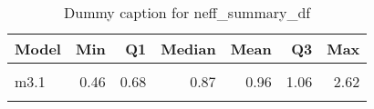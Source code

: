 \begin{table}
\centering
\caption{Dummy caption for neff_summary_df}
\centering
\fontsize{10}{12}\selectfont
\begin{tabular}[t]{lrrrrrr}
\toprule
Model & Min & Q1 & Median & Mean & Q3 & Max\\
\midrule
\cellcolor{gray!10}{m2} & \cellcolor{gray!10}{0.33} & \cellcolor{gray!10}{0.54} & \cellcolor{gray!10}{0.67} & \cellcolor{gray!10}{0.80} & \cellcolor{gray!10}{0.99} & \cellcolor{gray!10}{1.79}\\
m3.1 & 0.46 & 0.68 & 0.87 & 0.96 & 1.06 & 2.62\\
\cellcolor{gray!10}{m4} & \cellcolor{gray!10}{0.32} & \cellcolor{gray!10}{0.37} & \cellcolor{gray!10}{0.61} & \cellcolor{gray!10}{0.75} & \cellcolor{gray!10}{0.87} & \cellcolor{gray!10}{2.05}\\
\bottomrule
\end{tabular}
\end{table}
